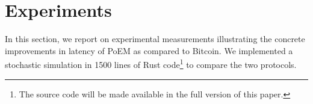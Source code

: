 \section{Experiments}\label{sec:experiments}

In this section, we report on experimental measurements illustrating the concrete improvements
in latency of PoEM as compared to Bitcoin. We implemented a stochastic simulation in 1500 lines of
Rust code\footnote{%
    The source code will be made available in the full version of this paper. %
    \ifanonymous
    \else
    \fi
} to compare the two protocols.

%
